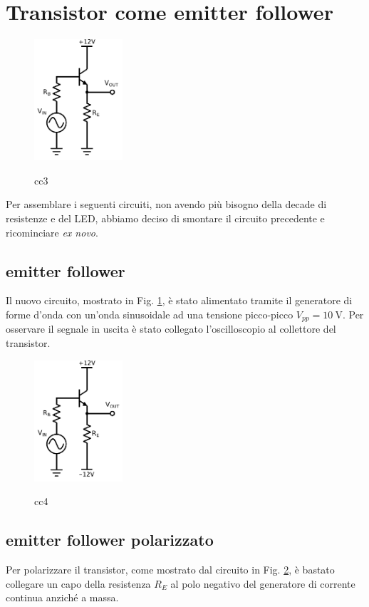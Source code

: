 \section{Transistor come emitter follower}
\begin{figure}
	\caption{cc3}
	\includegraphics[height=45mm]{cc3.pdf}
	\label{fig:cc3}
\end{figure}

Per assemblare i seguenti circuiti, non avendo più bisogno della decade di resistenze e del LED, abbiamo deciso di smontare il circuito precedente e ricominciare \emph{ex novo}.

\subsection{emitter follower}
Il nuovo circuito, mostrato in Fig. \ref{fig:cc3}, è stato alimentato tramite il generatore di forme d'onda con un'onda sinusoidale ad una tensione picco-picco $V_{pp} = \SI{10}{\volt}$. Per osservare il segnale in uscita è stato collegato l'oscilloscopio al collettore del transistor.

\begin{figure}
	\caption{cc4}
	\includegraphics[height=45mm]{cc4.pdf}
	\label{fig:cc4}
\end{figure}

\subsection{emitter follower polarizzato}
Per polarizzare il transistor, come mostrato dal circuito in Fig. \ref{fig:cc4}, è bastato collegare un capo della resistenza $R_E$ al polo negativo del generatore di corrente continua anziché a massa.

